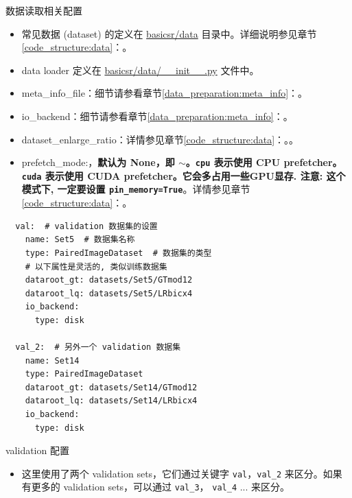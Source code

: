 \documentclass[../main.tex]{subfiles}
\begin{document}
\begin{exampleBox}[righthand ratio=0.00, sidebyside, sidebyside align=center, lower separated=false]{数据读取相关配置}
\begin{itemize}
    \item 常见数据 (dataset) 的定义在 \href{https://github.com/XPixelGroup/BasicSR/blob/master/basicsr/data}{basicsr/data} 目录中。详细说明参见章节\ref{code_structure:data}：。
    \item data loader 定义在 \href{https://github.com/XPixelGroup/BasicSR/blob/master/basicsr/data/__init__.py}{basicsr/data/\_\_init\_\_.py} 文件中。
    \item meta\_info\_file：细节请参看章节\ref{data_preparation:meta_info}：。
    \item io\_backend：细节请参看章节\ref{data_preparation:meta_info}：。
    \item dataset\_enlarge\_ratio：详情参见章节\ref{code_structure:data}：。。
    \item prefetch\_mode:，\textbf{默认为 None，即 $\sim$。\texttt{cpu} 表示使用 CPU prefetcher。\texttt{cuda} 表示使用 CUDA prefetcher。它会多占用一些GPU显存. 注意: 这个模式下, 一定要设置 \texttt{pin\_memory=True}}。详情参见章节\ref{code_structure:data}：。
\end{itemize}
\end{exampleBox}

\begin{verbatim}
  val:  # validation 数据集的设置
    name: Set5  # 数据集名称
    type: PairedImageDataset  # 数据集的类型
    # 以下属性是灵活的, 类似训练数据集
    dataroot_gt: datasets/Set5/GTmod12
    dataroot_lq: datasets/Set5/LRbicx4
    io_backend:
      type: disk

  val_2:  # 另外一个 validation 数据集
    name: Set14
    type: PairedImageDataset
    dataroot_gt: datasets/Set14/GTmod12
    dataroot_lq: datasets/Set14/LRbicx4
    io_backend:
      type: disk
\end{verbatim}

\begin{exampleBox}[righthand ratio=0.00, sidebyside, sidebyside align=center, lower separated=false]{validation 配置}
\begin{itemize}
    \item 这里使用了两个 validation sets，它们通过关键字 \texttt{val}，\texttt{val\_2} 来区分。如果有更多的 validation sets，可以通过 \texttt{val\_3}， \texttt{val\_4} ... 来区分。
\end{itemize}
\end{exampleBox}
\end{document}
